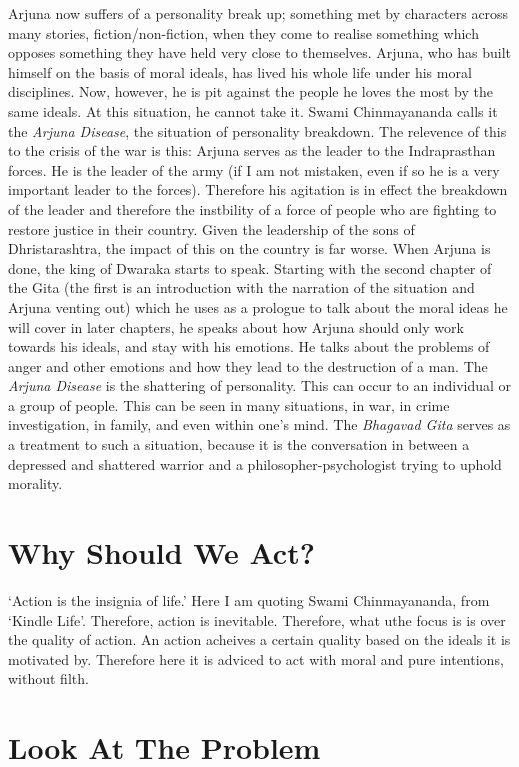 \documentclass{article}
\newcommand{\tit}[1]{\textit{#1}}
\newcommand{\bg}{\textit{Bhagavad Gita} }
\begin{document}
Arjuna now suffers of a personality break up; something met by characters across many stories, fiction/non-fiction, when they come to realise something which opposes something  they have held very close to themselves. Arjuna, who has built himself on the basis of moral ideals, has lived his whole life under his moral disciplines. Now, however, he is pit against the people he loves the most by the same ideals. At this situation, he cannot take it. Swami Chinmayananda calls it the \tit{Arjuna Disease}, the situation of personality breakdown. The relevence of this to the crisis of the war is this: Arjuna serves as the leader to the Indraprasthan forces. He is the leader of the army (if I am not mistaken, even if so he is a very important leader to the forces). Therefore his agitation is in effect the breakdown of the leader and therefore the instbility of a force of people who are fighting to restore justice in their country. Given the leadership of the sons of Dhristarashtra, the impact of this on the country is far worse. When Arjuna is done, the king of Dwaraka starts to speak. Starting with the second chapter of the Gita (the first is an introduction with the narration of the situation and Arjuna venting out) which he uses as a prologue to talk about the moral ideas he will cover in later chapters, he speaks about how Arjuna should only work towards his ideals, and stay with his emotions. He talks about the problems of anger and other emotions and how they lead to the destruction of a man. The \tit{Arjuna Disease} is the shattering of personality. This can occur to an individual or a group of people. This can be seen in many situations, in war, in crime investigation, in family, and even within one's mind. The \bg serves as a treatment to such a situation, because it is the conversation in between a depressed and shattered warrior and a philosopher-psychologist trying to uphold morality.
\newpage \section{Why Should We Act?}
`Action is the insignia of life.' Here I am quoting Swami Chinmayananda, from `Kindle Life'. Therefore, action is inevitable. Therefore, what uthe focus is is over the quality of action. An action acheives a certain quality based on the ideals it is motivated by. Therefore here it is adviced to act with moral and pure intentions, without filth.
\newpage \section{Look At The Problem}
\end{document}
